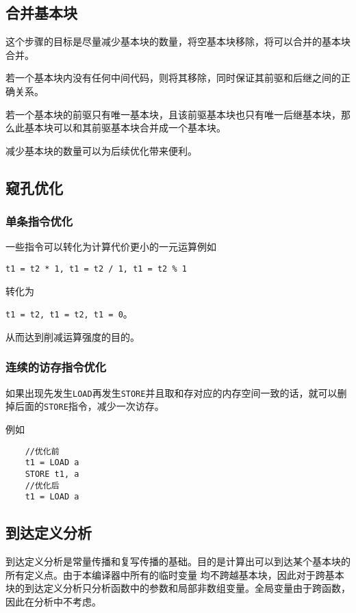 \subsection{合并基本块}

这个步骤的目标是尽量减少基本块的数量，将空基本块移除，将可以合并的基本块合并。

若一个基本块内没有任何中间代码，则将其移除，同时保证其前驱和后继之间的正确关系。

若一个基本块的前驱只有唯一基本块，且该前驱基本块也只有唯一后继基本块，那么此基本块可以和其前驱基本块合并成一个基本块。

减少基本块的数量可以为后续优化带来便利。

\subsection{窥孔优化}

\subsubsection{单条指令优化}

一些指令可以转化为计算代价更小的一元运算例如

\texttt{t1 = t2 * 1, t1 = t2 / 1, t1 = t2 \% 1}

转化为

\texttt{t1 = t2, t1 = t2, t1 = 0}。

从而达到削减运算强度的目的。

\subsubsection{连续的访存指令优化}

如果出现先发生\texttt{LOAD}再发生\texttt{STORE}并且取和存对应的内存空间一致的话，就可以删掉后面的\texttt{STORE}指令，减少一次访存。

例如
\begin{verbatim}
    //优化前
    t1 = LOAD a
    STORE t1, a
    //优化后
    t1 = LOAD a
\end{verbatim}

\subsection{到达定义分析}

到达定义分析是常量传播和复写传播的基础。目的是计算出可以到达某个基本块的所有定义点。由于本编译器中所有的临时变量
均不跨越基本块，因此对于跨基本块的到达定义分析只分析函数中的参数和局部非数组变量。全局变量由于跨函数，因此在分析中不考虑。

